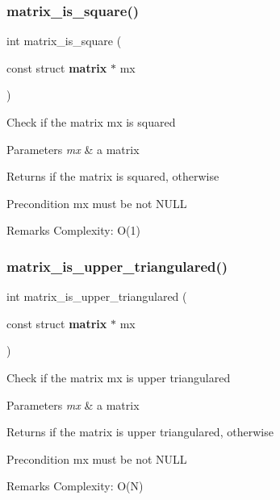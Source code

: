 \subsubsection{matrix\+\_\+is\+\_\+square()}
{\footnotesize\ttfamily int matrix\+\_\+is\+\_\+square (\begin{DoxyParamCaption}\item[{const struct \textbf{ matrix} $\ast$}]{mx }\end{DoxyParamCaption})\hspace{0.3cm}{\ttfamily [inline]}}

Check if the matrix {\ttfamily mx} is squared


\begin{DoxyParams}{Parameters}
{\em mx} & a matrix \\
\hline
\end{DoxyParams}
\begin{DoxyReturn}{Returns}
{} if the matrix is squared, {} otherwise
\end{DoxyReturn}
\begin{DoxyPrecond}{Precondition}
{\ttfamily mx} must be not N\+U\+LL
\end{DoxyPrecond}
\begin{DoxyRemark}{Remarks}
Complexity\+: O(1) 
\end{DoxyRemark}
\mbox{\label{matrix_8c_ae3a4575aa2b0493bbf0b7bee70d30f07}} 
\subsubsection{matrix\+\_\+is\+\_\+upper\+\_\+triangulared()}
{\footnotesize\ttfamily int matrix\+\_\+is\+\_\+upper\+\_\+triangulared (\begin{DoxyParamCaption}\item[{const struct \textbf{ matrix} $\ast$}]{mx }\end{DoxyParamCaption})\hspace{0.3cm}{\ttfamily [inline]}}

Check if the matrix {\ttfamily mx} is upper triangulared


\begin{DoxyParams}{Parameters}
{\em mx} & a matrix \\
\hline
\end{DoxyParams}
\begin{DoxyReturn}{Returns}
{} if the matrix is upper triangulared, {} otherwise
\end{DoxyReturn}
\begin{DoxyPrecond}{Precondition}
{\ttfamily mx} must be not N\+U\+LL
\end{DoxyPrecond}
\begin{DoxyRemark}{Remarks}
Complexity\+: O(\+N) 
\end{DoxyRemark}
\mbox{\label{matrix_8c_a41f40f546c465fd096679a7f94ea5e8b}} 
